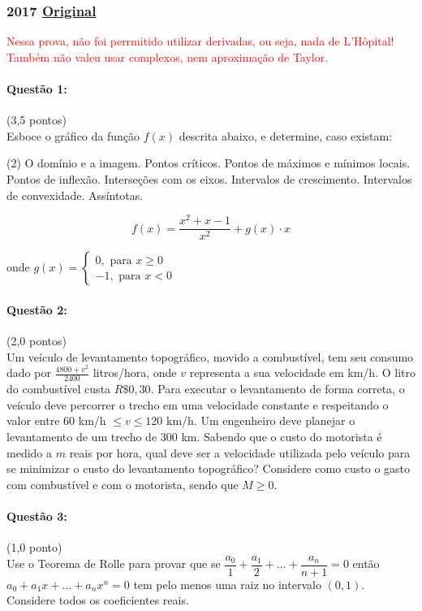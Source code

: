 \documentclass[12pt,a4paper]{article}
\newcommand{\original}[1]{\tiny \href{#1}{Original} \normalsize}
\begin{document}
\subsubsection{2017 \original{https://drive.google.com/file/d/1ZAImwda_-AjUhh0gd20wXibnRYYiKFVV/view?usp=sharing}}
\normalsize{
\textcolor{red}{Nessa prova, não foi perrmitido utilizar derivadas, ou seja, nada de L'Hôpital! Também não valeu usar complexos, nem aproximação de Taylor.}

\paragraph{Questão 1: }(3,5 pontos) \\
Esboce o gráfico da função $f(x)$ descrita abaixo, e determine, caso existam:

\begin{tasks}(2)
\task O domínio e a imagem.
\task Pontos críticos.
\task Pontos de máximos e mínimos locais.
\task Pontos de inflexão.
\task Interseções com os eixos.
\task Intervalos de crescimento.
\task Intervalos de convexidade.
\task Assíntotas.
\end{tasks}

$$f(x) = \dfrac{x^2 + x - 1}{x^2} + g(x)\cdot x$$

onde $g(x) = \begin{cases}0,\textrm{ para }x\ge 0 \\ -1,\textrm{ para }x < 0\end{cases}$

\paragraph{Questão 2: }(2,0 pontos) \\
Um veículo de levantamento topográfico, movido a combustível, tem seu consumo dado por $\frac{4800+v^2}{2400}$ litros/hora, onde $v$ representa a sua velocidade em km/h. O litro do combustível custa $R\$ 0,30$. Para executar o levantamento de forma correta, o veículo deve percorrer o trecho em uma velocidade constante e respeitando o valor entre $60$ km/h $\le v \le 120$ km/h.
Um engenheiro deve planejar o levantamento de um trecho de $300$ km. Sabendo que o custo do motorista é medido a $m$ reais por hora, qual deve ser a velocidade utilizada pelo veículo para se minimizar o custo do levantamento topográfico?
Considere como custo o gasto com combustível e com o motorista, sendo que $M\ge0$.

\paragraph{Questão 3: }(1,0 ponto) \\
Use o Teorema de Rolle para provar que se $\dfrac{a_0}{1} + \dfrac{a_1}{2} + \dots + \dfrac{a_n}{n+1} = 0$ então $a_0 + a_1 x + \dots + a_nx^n = 0$ tem pelo menos uma raiz no intervalo $(0,1)$.
Considere todos os coeficientes reais.

}
\end{document}
